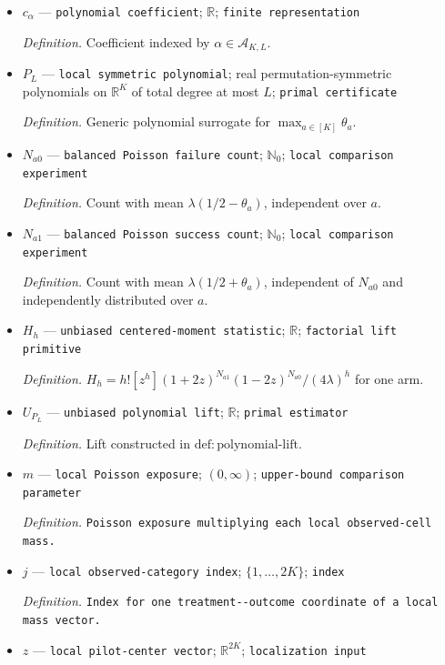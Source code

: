 \documentclass{article}
\begin{document}
\begin{itemize}
  \item \(c_\alpha\) --- \texttt{polynomial coefficient}; \(\mathbb R\); \texttt{finite representation}
  \par\smallskip\noindent\emph{Definition.} Coefficient indexed by \(\alpha\in\mathcal A_{K,L}\).
  \item \(P_L\) --- \texttt{local symmetric polynomial}; real permutation-symmetric polynomials on \(\mathbb R^K\) of total degree at most \(L\); \texttt{primal certificate}
  \par\smallskip\noindent\emph{Definition.} Generic polynomial surrogate for \(\max_{a\in[K]}\theta_a\).
  \item \(N_{a0}\) --- \texttt{balanced Poisson failure count}; \(\mathbb N_0\); \texttt{local comparison experiment}
  \par\smallskip\noindent\emph{Definition.} Count with mean \(\lambda(1/2-\theta_a)\), independent over \(a\).
  \item \(N_{a1}\) --- \texttt{balanced Poisson success count}; \(\mathbb N_0\); \texttt{local comparison experiment}
  \par\smallskip\noindent\emph{Definition.} Count with mean \(\lambda(1/2+\theta_a)\), independent of \(N_{a0}\) and independently distributed over \(a\).
  \item \(H_h\) --- \texttt{unbiased centered-\allowbreak{}moment statistic}; \(\mathbb R\); \texttt{factorial lift primitive}
  \par\smallskip\noindent\emph{Definition.} \(H_h=h![z^h](1+2z)^{N_{a1}}(1-2z)^{N_{a0}}/(4\lambda)^h\) for one arm.
  \item \(U_{P_L}\) --- \texttt{unbiased polynomial lift}; \(\mathbb R\); \texttt{primal estimator}
  \par\smallskip\noindent\emph{Definition.} Lift constructed in \(\mathrm{def{:}polynomial\text{-}lift}\).
  \item \(m\) --- \texttt{local Poisson exposure}; \((0,\infty)\); \texttt{upper-\allowbreak{}bound comparison parameter}
  \par\smallskip\noindent\emph{Definition.} \texttt{Poisson exposure multiplying each local observed-\allowbreak{}cell mass.}
  \item \(j\) --- \texttt{local observed-\allowbreak{}category index}; \(\{1,\ldots,2K\}\); \texttt{index}
  \par\smallskip\noindent\emph{Definition.} \texttt{Index for one treatment-\allowbreak{}-\allowbreak{}outcome coordinate of a local mass vector.}
  \item \(z\) --- \texttt{local pilot-\allowbreak{}center vector}; \(\mathbb R^{2K}\); \texttt{localization input}

\end{itemize}
\end{document}
